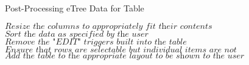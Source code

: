 \documentclass{article}
\begin{document}
\begin{algorithm}
\caption{Post-Processing eTree Data for Table}
\begin{algorithmic}[1]
\State $\textit{Resize the columns to appropriately fit their contents}$
\State $\textit{Sort the data as specified by the user}$
\State $\textit{Remove the "EDIT" triggers built into the table}$
\State $\textit{Ensure that rows are selectable but individual items are not}$
\State $\textit{Add the table to the appropriate layout to be shown to the user}$
\EndProcedure
\end{algorithmic}
\end{algorithm}
\end{document}
